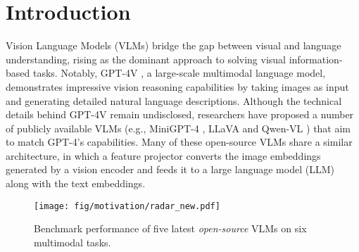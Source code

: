 \section{Introduction}


Vision Language Models (VLMs) bridge the gap between visual and language understanding, rising as the dominant approach to solving visual information-based tasks. Notably, GPT-4V \cite{openai2023gpt4}, a large-scale multimodal language model, demonstrates impressive vision reasoning capabilities by taking images as input and generating detailed natural language descriptions. Although the technical details behind GPT-4V remain undisclosed, researchers have proposed a number of publicly available VLMs (e.g., MiniGPT-4 \cite{chen2023minigpt}, LLaVA \cite{liu2023improved} and Qwen-VL \cite{bai2023qwen}) that aim to match GPT-4's capabilities. Many of these open-source VLMs share a similar architecture, in which a feature projector converts the image embeddings generated by a vision encoder and feeds it to a large language model (LLM) along with the text embeddings.




\begin{figure}[!t]
    \centering
    \texttt{[image: fig/motivation/radar\_new.pdf]}
    \caption{Benchmark performance of five latest \textit{open-source} VLMs on six multimodal tasks. 
    }
    \label{fig:existing-vlm-performance}
    \vspace{-6mm}
\end{figure}





